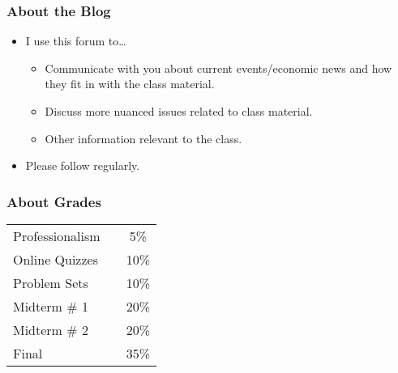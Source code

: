 \documentclass[9pt]{beamer}
\begin{document}

\begin{frame}[t]
\frametitle{About the Blog}
\begin{itemize}
\item I use this forum to\ldots
\begin{itemize}
\medskip
\item Communicate with you about current events/economic news and how they fit in with the class material.
\medskip
\item Discuss more nuanced issues related to class material.
\medskip
\item Other information relevant to the class.
\end{itemize}
\bigskip
\item Please follow regularly.
\end{itemize}
\end{frame}



\begin{frame}[t]
\frametitle{About Grades}
\bigskip
\begin{table}[t]
\setlength {\tabcolsep}{3.75mm}
\vspace{0.01cm}
\renewcommand{\arraystretch}{1.5}
\begin{center}
\begin{tabular}{lcc}
\hline
    Professionalism &\hspace*{0.50in}&   5\%  \\
    Online Quizzes && 10\% \\
    Problem Sets &&  10\% \\
    Midterm \# 1 &&  20\% \\
    Midterm \# 2 &&  20\% \\
    Final &&  35\% \\
    \hline
\end{tabular}
\end{center}
\end{table}

\end{frame}


\end{document}
